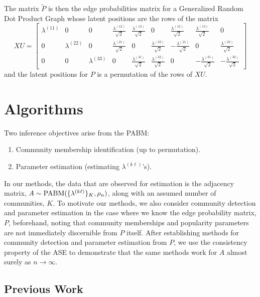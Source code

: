 \documentclass[12pt]{article}
\providecommand{\tightlist}{%
  \setlength{\itemsep}{0pt}\setlength{\parskip}{0pt}}
\begin{document}
\begin{example}
The matrix $\tilde{P}$ is then the edge probabilities matrix for a 
Generalized Random Dot Product Graph whose latent positions 
are the rows of the matrix
$$XU = \begin{bmatrix}
  \lambda^{(11)} & 0 & 0 &
  \frac{\lambda^{(12)}}{\sqrt{2}} & \frac{\lambda^{(13)}}{\sqrt{2}} & 0 &
  \frac{\lambda^{(12)}}{\sqrt{2}} & \frac{\lambda^{(13)}}{\sqrt{2}} & 0 \\
  0 & \lambda^{(22)} & 0 &
  \frac{\lambda^{(21)}}{\sqrt{2}} & 0 & \frac{\lambda^{(23)}}{\sqrt{2}} &
  -\frac{\lambda^{(21)}}{\sqrt{2}} & 0 & \frac{\lambda^{(23)}}{\sqrt{2}} \\
  0 & 0 & \lambda^{(33)} &
  0 & \frac{\lambda^{(31)}}{\sqrt{2}} & \frac{\lambda^{(32)}}{\sqrt{2}} &
  0 & -\frac{\lambda^{(31)}}{\sqrt{2}} & -\frac{\lambda^{(32)}}{\sqrt{2}}
\end{bmatrix}$$
and the latent positions for $P$ is a permutation of the rows of
$XU$. 
\end{example}

\hypertarget{methods}{%
\section{Algorithms}\label{methods}}

Two inference objectives arise from the PABM:

\begin{enumerate}
\def\labelenumi{\arabic{enumi}.}
\tightlist
\item
  Community membership identification (up to permutation).
\item
  Parameter estimation (estimating \(\lambda^{(k \ell)}\)'s).
\end{enumerate}

In our methods, the data that are observed for estimation is the adjacency matrix, $A \sim \mathrm{PABM}(\{\lambda^{(k \ell)}\}_K, \rho_n)$, along with an assumed number of communities, $K$. 
To motivate our methods, we also consider community detection and parameter estimation in the case where we know the edge probability matrix, $P$, beforehand, noting that community memberships and popularity parameters are not immediately discernible from $P$ itself. 
After establishing methods for community detection and parameter estimation from $P$, we use the consistency property of the ASE \citep{doi:10.1080/01621459.2012.699795,rubindelanchy2017statistical} to demonstrate that the same methods work for $A$ almost surely as $n \to \infty$.

\hypertarget{related-work}{%
\subsection{Previous Work}\label{related-work}}
\end{document}
